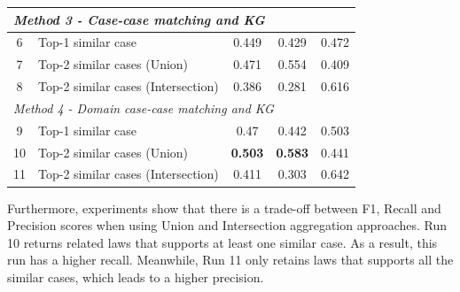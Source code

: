 \documentclass[conference]{IEEEtran}
\begin{document}
\begin{table}[ht]
\begin{tabular}{|c|l|c|c|c|}
\multicolumn{5}{|l|}{\textit{Method 3 - Case-case matching and KG}}                                                                                                                                                       \\ \hline
\multicolumn{1}{|c|}{6}           & \multicolumn{1}{l|}{Top-1 similar case}                 & \multicolumn{1}{c|}{0.449}          & \multicolumn{1}{c|}{0.429}           & 0.472              \\ \hline
\multicolumn{1}{|c|}{7}           & \multicolumn{1}{l|}{Top-2 similar cases (Union)}        & \multicolumn{1}{c|}{0.471}          & \multicolumn{1}{c|}{0.554}           & 0.409              \\ \hline
\multicolumn{1}{|c|}{8}           & \multicolumn{1}{l|}{Top-2 similar cases (Intersection)} & \multicolumn{1}{c|}{0.386}          & \multicolumn{1}{c|}{0.281}           & 0.616              \\ \hline
\multicolumn{5}{|l|}{\textit{Method 4 - Domain case-case matching and KG}}                                                                                                                                                       \\ \hline
\multicolumn{1}{|c|}{9}           & \multicolumn{1}{l|}{Top-1 similar case}                 & \multicolumn{1}{c|}{0.47}           & \multicolumn{1}{c|}{0.442}           & 0.503              \\ \hline
\multicolumn{1}{|c|}{10}          & \multicolumn{1}{l|}{Top-2 similar cases (Union)}        & \multicolumn{1}{c|}{\textbf{0.503}} & \multicolumn{1}{c|}{\textbf{0.583}}  & 0.441              \\ \hline
\multicolumn{1}{|c|}{11}          & \multicolumn{1}{l|}{Top-2 similar cases (Intersection)} & \multicolumn{1}{c|}{0.411}          & \multicolumn{1}{c|}{0.303}           & 0.642              \\ \hline
\end{tabular}
\end{table}
Furthermore, experiments show that there is a trade-off between F1, Recall and Precision scores when using Union and Intersection aggregation approaches. 
Run 10 returns related laws that supports at least one similar case. As a result, this run has a higher recall. Meanwhile, Run 11 only retains laws that supports all the similar cases, which leads to a higher precision. 
\end{document}
